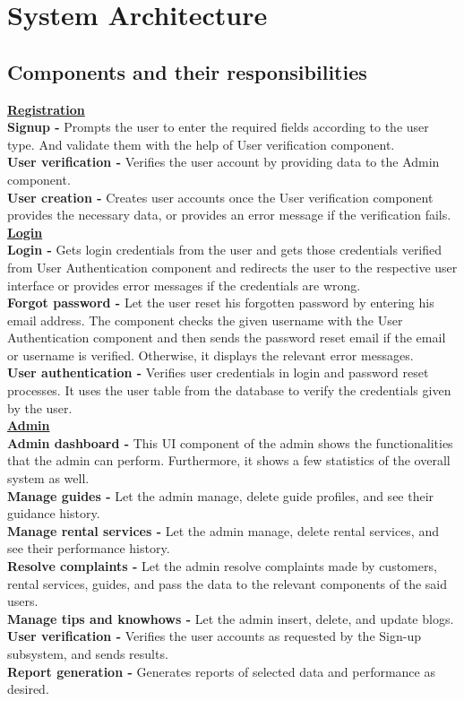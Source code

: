 \section{System Architecture}
\subsection{Components and their responsibilities}

\underline{\textbf{Registration}}\\
\textbf{Signup - }Prompts the user to enter the required fields according to the user type. And validate them with the help of User verification component.\\
\textbf{User verification - } Verifies the user account by providing data to the Admin component.\\
\textbf{User creation - } Creates user accounts once the User verification component provides the necessary data, or provides an error message if the verification fails.\\

\underline{\textbf{Login}}\\
\textbf{Login - }Gets login credentials from the user and gets those credentials verified from User Authentication component and redirects the user to the respective user interface or provides error messages if the credentials are wrong.\\
\textbf{Forgot password - }Let the user reset his forgotten password by entering his email address. The component checks the given username with the User Authentication component and then sends the password reset email if the email or username is verified. Otherwise, it displays the relevant error messages.\\
\textbf{User authentication - }Verifies user credentials in login and password reset processes. It uses the user table from the database to verify the credentials given by the user.\\

\underline{\textbf{Admin}}\\
\textbf{Admin dashboard - }This UI component of the admin shows the functionalities that the admin can perform. Furthermore, it shows a few statistics of the overall system as well.\\
\textbf{Manage guides - }Let the admin manage, delete guide profiles, and see their guidance history.\\
\textbf{Manage rental services - }Let the admin manage, delete rental services, and see their performance history.\\
\textbf{Resolve complaints - }Let the admin resolve complaints made by customers, rental services, guides, and pass the data to the relevant components of the said users.\\
\textbf{Manage tips and knowhows - }Let the admin insert, delete, and update blogs.\\
\textbf{User verification - }Verifies the user accounts as requested by the Sign-up subsystem, and sends results.\\
\textbf{Report generation - }Generates reports of selected data and performance as desired.\\

